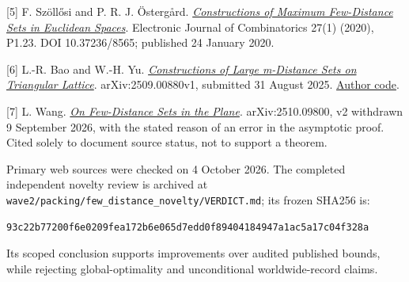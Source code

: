 \documentclass[
]{article}
\begin{document}
{[}5{]} F. Szöllősi and P. R. J. Östergård.
\href{https://www.combinatorics.org/ojs/index.php/eljc/article/view/v27i1p23}{\emph{Constructions
of Maximum Few-Distance Sets in Euclidean Spaces}}. Electronic Journal
of Combinatorics 27(1) (2020), P1.23. DOI 10.37236/8565; published 24
January 2020.

{[}6{]} L.-R. Bao and W.-H. Yu.
\href{https://arxiv.org/html/2509.00880}{\emph{Constructions of Large
m-Distance Sets on Triangular Lattice}}. arXiv:2509.00880v1, submitted
31 August 2025.
\href{https://github.com/BaoCoder613/triangular-m-distance}{Author
code}.

{[}7{]} L. Wang. \href{https://arxiv.org/abs/2510.09800}{\emph{On
Few-Distance Sets in the Plane}}. arXiv:2510.09800, v2 withdrawn 9
September 2026, with the stated reason of an error in the asymptotic
proof. Cited solely to document source status, not to support a theorem.

Primary web sources were checked on 4 October 2026. The completed
independent novelty review is archived at
\texttt{wave2/packing/few\_distance\_novelty/VERDICT.md}; its frozen
SHA256 is:

\begin{verbatim}
93c22b77200f6e0209fea172b6e065d7edd0f89404184947a1ac5a17c04f328a
\end{verbatim}

Its scoped conclusion supports improvements over audited published
bounds, while rejecting global-optimality and unconditional
worldwide-record claims.
\end{document}

